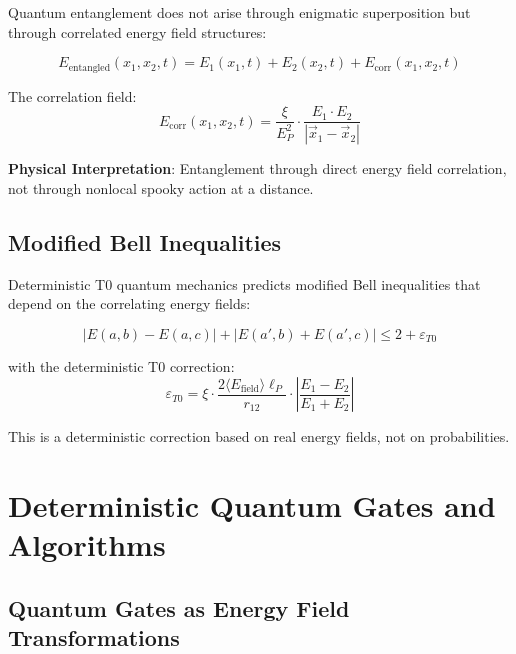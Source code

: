 \documentclass[12pt,a4paper]{article}
\newcommand{\xipar}{\xi}
\newcommand{\EPlanck}{E_P}
\theoremstyle{definition}
\theoremstyle{remark}
\begin{document}
	Quantum entanglement does not arise through enigmatic superposition but through correlated energy field structures:
	
	\begin{equation}
		E_{\text{entangled}}(x_1, x_2, t) = E_1(x_1, t) + E_2(x_2, t) + E_{\text{corr}}(x_1, x_2, t)
		\label{eq:deterministic_entanglement}
	\end{equation}
	
	The correlation field:
	\begin{equation}
		E_{\text{corr}}(x_1, x_2, t) = \frac{\xipar}{\EPlanck^2} \cdot \frac{E_1 \cdot E_2}{|\vec{x}_1 - \vec{x}_2|}
		\label{eq:correlation_field}
	\end{equation}
	
	\textbf{Physical Interpretation}: Entanglement through direct energy field correlation, not through nonlocal spooky action at a distance.
	
	\subsection{Modified Bell Inequalities}
	
	Deterministic T0 quantum mechanics predicts modified Bell inequalities that depend on the correlating energy fields:
	
	\begin{equation}
		\boxed{|E(a,b) - E(a,c)| + |E(a',b) + E(a',c)| \leq 2 + \varepsilon_{T0}}
		\label{eq:modified_bell_deterministic}
	\end{equation}
	
	with the deterministic T0 correction:
	\begin{equation}
		\varepsilon_{T0} = \xipar \cdot \frac{2\langle E_{\text{field}} \rangle \ell_P}{r_{12}} \cdot \left|\frac{E_1 - E_2}{E_1 + E_2}\right|
		\label{eq:deterministic_bell_correction}
	\end{equation}
	
	This is a deterministic correction based on real energy fields, not on probabilities.
	
	\section{Deterministic Quantum Gates and Algorithms}
	
	\subsection{Quantum Gates as Energy Field Transformations}
	
\end{document}
